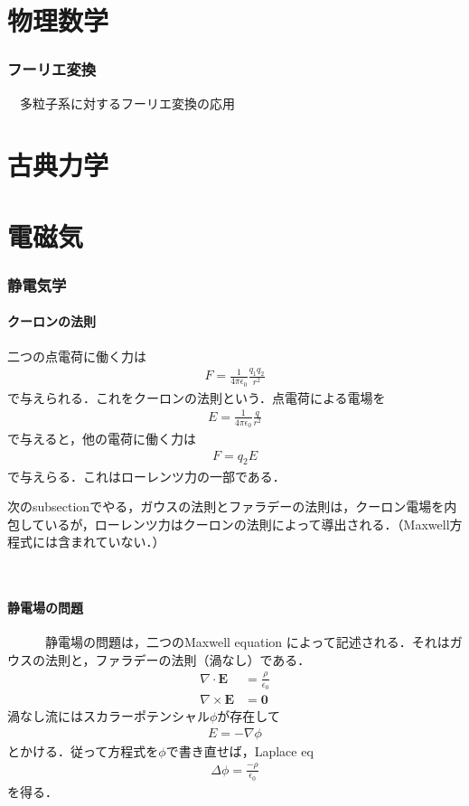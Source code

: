 \documentclass[a4j]{jarticle}
\begin{document}
\part{物理数学}
\section{フーリエ変換}
　多粒子系に対するフーリエ変換の応用
　

\part{古典力学}





\part{電磁気}
\section{静電気学}
\subsection{クーロンの法則}
二つの点電荷に働く力は
\begin{align*}
 F=\frac{1}{4\pi \epsilon_0}\frac{q_1q_2}{r^2}
\end{align*}
で与えられる．これをクーロンの法則という．点電荷による電場を
\begin{align*}
 E=\frac{1}{4\pi \epsilon_0}\frac{q}{r^2}
\end{align*}
で与えると，他の電荷に働く力は
\begin{align*}
 F=q_2E
\end{align*}
で与えらる．これはローレンツ力の一部である．

次のsubsectionでやる，ガウスの法則とファラデーの法則は，クーロン電場を内包しているが，ローレンツ力はクーロンの法則によって導出される．（Maxwell方程式には含まれていない．）


　　\subsection{静電場の問題}
　　　静電場の問題は，二つのMaxwell equation によって記述される．それはガウスの法則と，ファラデーの法則（渦なし）である．
\begin{align*}
 \nabla \cdot {\bm E}&=\frac{\rho}{\epsilon_0}\\
 \nabla \times {\bm E}&={\bm 0}
\end{align*}
渦なし流にはスカラーポテンシャル$\phi$が存在して
\begin{align*}
 E=-\nabla\phi
\end{align*}
とかける．従って方程式を$\phi$で書き直せば，Laplace eq
\begin{align*}
 \Delta \phi =\frac{-\rho}{\epsilon_0}
\end{align*}
を得る．
\end{document}
